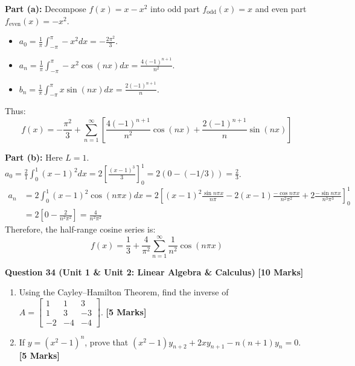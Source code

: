\begin{solbox}
\textbf{Part (a):}
Decompose $f(x) = x - x^2$ into odd part $f_{\text{odd}}(x) = x$ and even part $f_{\text{even}}(x) = -x^2$.
\begin{itemize}
    \item $a_0 = \frac{1}{\pi}\int_{-\pi}^\pi -x^2 dx = -\frac{2\pi^2}{3}$.
    \item $a_n = \frac{1}{\pi}\int_{-\pi}^\pi -x^2 \cos(nx)dx = \frac{4(-1)^{n+1}}{n^2}$.
    \item $b_n = \frac{1}{\pi}\int_{-\pi}^\pi x \sin(nx)dx = \frac{2(-1)^{n+1}}{n}$.
\end{itemize}
Thus:
\begin{equation}
f(x) = -\frac{\pi^2}{3} + \sum_{n=1}^\infty \left[ \frac{4(-1)^{n+1}}{n^2}\cos(nx) + \frac{2(-1)^{n+1}}{n}\sin(nx) \right]
\end{equation}

\textbf{Part (b):}
Here $L = 1$.
$a_0 = \frac{2}{1}\int_0^1 (x-1)^2 dx = 2\left[ \frac{(x-1)^3}{3} \right]_0^1 = 2(0 - (-1/3)) = \frac{2}{3}$.
\begin{align}
a_n &= 2\int_0^1 (x-1)^2 \cos(n\pi x)dx = 2 \left[ (x-1)^2 \frac{\sin n\pi x}{n\pi} - 2(x-1)\frac{-\cos n\pi x}{n^2\pi^2} + 2\frac{-\sin n\pi x}{n^3\pi^3} \right]_0^1 \\
&= 2 \left[ 0 - \frac{2}{n^2\pi^2} \right] = \frac{4}{n^2\pi^2}
\end{align}
Therefore, the half-range cosine series is:
\begin{equation}
f(x) = \frac{1}{3} + \frac{4}{\pi^2}\sum_{n=1}^\infty \frac{1}{n^2}\cos(n\pi x)
\end{equation}
\end{solbox}

\vspace{4mm}
\noindent\textbf{Question 34 (Unit 1 \& Unit 2: Linear Algebra \& Calculus)} \hfill \textbf{[10 Marks]}
\begin{enumerate}[label=(\alph*),topsep=2pt,itemsep=2pt]
    \item Using the Cayley--Hamilton Theorem, find the inverse of $A = \begin{bmatrix} 1 & 1 & 3 \\ 1 & 3 & -3 \\ -2 & -4 & -4 \end{bmatrix}$. \hfill \textbf{[5 Marks]}
    \item If $y = (x^2-1)^n$, prove that $(x^2-1)y_{n+2} + 2xy_{n+1} - n(n+1)y_n = 0$. \hfill \textbf{[5 Marks]}
\end{enumerate}

